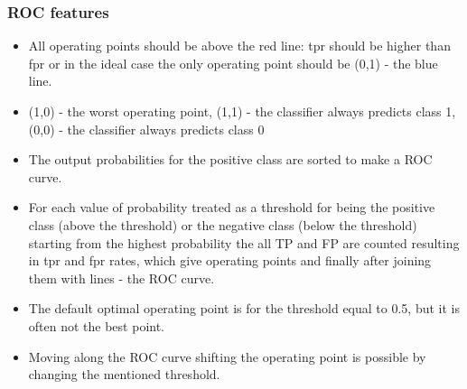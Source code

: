 \documentclass[smaller, proffesionalfonts]{beamer}
\begin{document}
\begin{frame}
\frametitle{ROC features}
\begin{block}{}
\begin{itemize}
\item 
All operating points should be above the red line: tpr should be higher than fpr or in the ideal case the only operating point should be (0,1) - the blue line.
\item 
(1,0) - the worst operating point, (1,1) - the classifier always predicts class 1, (0,0) - the classifier always predicts class 0
\item 
The output probabilities for the positive class are sorted to make a ROC curve.
\item
For each value of probability treated as a threshold for being the positive class (above the threshold) or the negative class (below the threshold) starting from the highest probability the all TP and FP are counted resulting in tpr and fpr rates, which give operating points and finally after joining them with lines - the ROC curve.
\item
The default optimal operating point is for the threshold equal to 0.5, but it is often not the best point.
\item
Moving along the ROC curve shifting the operating point is possible by changing the mentioned threshold.
\end{itemize}
\end{block}
\end{frame}
\end{document}
